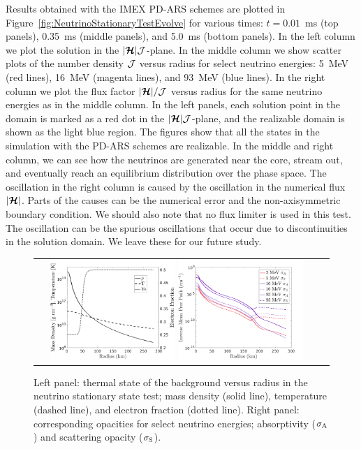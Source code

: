 Results obtained with the IMEX PD-ARS schemes are plotted in Figure~\ref{fig:NeutrinoStationaryTestEvolve} for various times: $t=0.01$~ms (top panels), 0.35~ms (middle panels), and 5.0~ms (bottom panels).  
In the left column we plot the solution in the $|\boldsymbol{\mathcal{H}}|\mathcal{J}$-plane.  
In the middle column we show scatter plots of the number density $\mathcal{J}$ versus radius for select neutrino energies: 5~MeV (red lines), 16~MeV (magenta lines), and $93$~MeV (blue lines).  
In the right column we plot the flux factor $|\boldsymbol{\mathcal{H}}|/\mathcal{J}$ versus radius for the same neutrino energies as in the middle column. 
In the left panels, each solution point in the domain is marked as a red dot in the $|\boldsymbol{\mathcal{H}}|\mathcal{J}$-plane, and the realizable domain is shown as the light blue region.  
The figures show that all the states in the simulation with the PD-ARS schemes are realizable.
In the middle and right column, we can see how the neutrinos are generated near the core, stream out, and eventually reach an equilibrium distribution over the phase space.
The oscillation in the right column is caused by the oscillation in the numerical flux $|\boldsymbol{\mathcal{H}}|$.
Parts of the causes can be the numerical error and the non-axisymmetric boundary condition.
We should also note that no flux limiter is used in this test.
The oscillation can be the spurious oscillations that occur due to discontinuities in the solution domain.
We leave these for our future study.

\begin{figure}[h]
  \centering
  \begin{tabular}{cc}
    \includegraphics[width=0.45\textwidth]{figures/NStatinaryS_EOS}
    \hspace{30pt}
    \includegraphics[width=0.45\textwidth]{figures/NSS_Opacities}
  \end{tabular}
   \caption{Left panel: thermal state of the background versus radius in the neutrino stationary state test; mass density (solid line), temperature (dashed line), and electron fraction (dotted line).  Right panel: corresponding opacities for select neutrino energies; absorptivity ($\sigma_{{\rm A}}$) and scattering opacity ($ \sigma_{{\rm S}}$).}
   \label{fig:NeutrinoStationaryTestEOS}
\end{figure}

